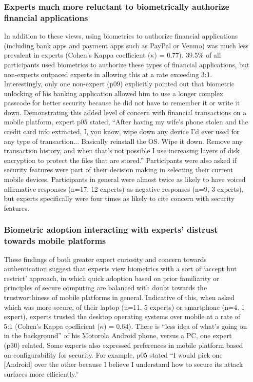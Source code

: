 \subsubsection{Experts much more reluctant to biometrically authorize financial applications}
In addition to these views, using biometrics to authorize financial applications (including bank apps and payment apps such as PayPal or Venmo) was much less prevalent in experts (Cohen's Kappa coefficient (\(\kappa\)) = 0.77). 39.5\% of all participants used biometrics to authorize these types of financial applications, but non-experts outpaced experts in allowing this at a rate exceeding 3:1. Interestingly, only one non-expert (p09) explicitly pointed out that biometric unlocking of his banking application allowed him to use a longer complex passcode for better security because he did not have to remember it or write it down. Demonstrating this added level of concern with financial transactions on a mobile platform, expert p05 stated, ``After having my wife's phone stolen and the credit card info extracted, I, you know, wipe down any device I'd ever used for any type of transaction... Basically reinstall the OS. Wipe it down. Remove any transaction history, and when that's not possible I use increasing layers of disk encryption to protect the files that are stored.'' Participants were also asked if security features were part of their decision making in selecting their current mobile devices. Participants in general were almost twice as likely to have voiced affirmative responses (n=17, 12 experts) as negative responses (n=9, 3 experts), but experts specifically were four times as likely to cite concern with security features. 

\subsubsection{Biometric adoption interacting with experts' distrust towards mobile platforms}
These findings of both greater expert curiosity and concern towards authentication suggest that experts view biometrics with a sort of `accept but restrict' approach, in which quick adoption based on prior familiarity or principles of secure computing are balanced with doubt towards the trustworthiness of mobile platforms in general. Indicative of this, when asked which was more secure, of their laptop (n=11, 5 experts) or smartphone (n=4, 1 expert), experts trusted the desktop operating systems over mobile at a rate of 5:1 (Cohen's Kappa coefficient (\(\kappa\)) = 0.64). There is ``less idea of what's going on in the background'' of his Motorola Android phone, versus a PC, one expert (p30) related. Some experts also expressed preferences in mobile platform based on configurability for security. For example, p05 stated ``I would pick one [Android] over the other because I believe I understand how to secure its attack surfaces more efficiently.''

